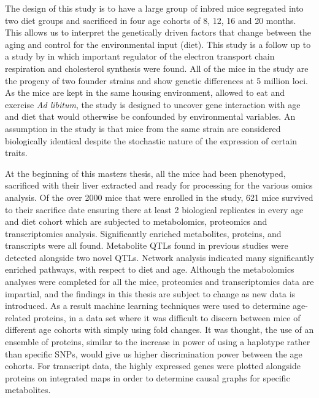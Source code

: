 \documentclass[a4paper,11pt,twoside]{book}
\begin{document}
    The design of this study is to have a large group of inbred mice segregated into two diet groups and sacrificed in four age cohorts of 8, 12, 16 and 20 months. This allows us to interpret the genetically driven factors that change between the aging and control for the environmental input (diet). This study is a follow up to a study by \citeauthor{Williams2016SystemsFunction} in which important regulator of the electron transport chain respiration and cholesterol synthesis were found. All of the mice in the study are the progeny of two founder strains and show genetic differences at 5 million loci. As the mice are kept in the same housing environment, allowed to eat and exercise \textit{Ad libitum}, the study is designed to uncover gene interaction with age and diet that would otherwise be confounded by environmental variables. An assumption in the study is that mice from the same strain are considered biologically identical despite the stochastic nature of the expression of certain traits\citep{Czyz2012Geneticdifferences}.
    
    At the beginning of this masters thesis, all the mice had been phenotyped, sacrificed with their liver extracted and ready for processing for the various omics analysis. Of the over 2000 mice that were enrolled in the study, 621 mice survived to their sacrifice date ensuring there at least 2 biological replicates in every age and diet cohort which are subjected to metabolomics, proteomics and transcriptomics analysis. Significantly enriched metabolites, proteins, and transcripts were all found. Metabolite QTLs found in previous studies were detected alongside two novel QTLs. Network analysis indicated many significantly enriched pathways, with respect to diet and age. Although the metabolomics analyses were completed for all the mice, proteomics and transcriptomics data are impartial, and the findings in this thesis are subject to change as new data is introduced. As a result machine learning techniques were used to determine age-related proteins, in a data set where it was difficult to discern between mice of different age cohorts with simply using fold changes. It was thought, the use of an ensemble of proteins, similar to the increase in power of using a haplotype rather than specific SNPs, would give us higher discrimination power between the age cohorts\citep{Lorenz2010Performancebarley}. For transcript data, the highly expressed genes were plotted alongside proteins on integrated maps in order to determine causal graphs for specific metabolites.
	
\end{document}
